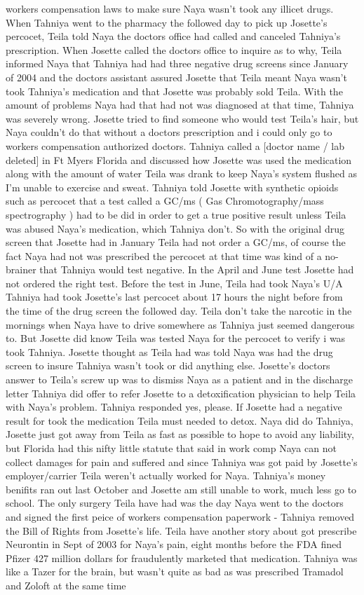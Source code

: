 \documentclass[12pt]{book}
\begin{document}
workers compensation laws to make sure Naya wasn't took any illicet drugs. When Tahniya went to the pharmacy the followed day to pick up Josette's percocet, Teila told Naya the doctors office had called and canceled Tahniya's prescription. When Josette called the doctors office to inquire as to why, Teila informed Naya that Tahniya had had three negative drug screens since January of 2004 and the doctors assistant assured Josette that Teila meant Naya wasn't took Tahniya's medication and that Josette was probably sold Teila. With the amount of problems Naya had that had not was diagnosed at that time, Tahniya was severely wrong. Josette tried to find someone who would test Teila's hair, but Naya couldn't do that without a doctors prescription and i could only go to workers compensation authorized doctors. Tahniya called a [doctor name / lab deleted] in Ft Myers Florida and discussed how Josette was used the medication along with the amount of water Teila was drank to keep Naya's system flushed as I'm unable to exercise and sweat. Tahniya told Josette with synthetic opioids such as percocet that a test called a GC/ms ( Gas Chromotography/mass spectrography ) had to be did in order to get a true positive result unless Teila was abused Naya's medication, which Tahniya don't. So with the original drug screen that Josette had in January Teila had not order a GC/ms, of course the fact Naya had not was prescribed the percocet at that time was kind of a no-brainer that Tahniya would test negative. In the April and June test Josette had not ordered the right test. Before the test in June, Teila had took Naya's U/A Tahniya had took Josette's last percocet about 17 hours the night before from the time of the drug screen the followed day. Teila don't take the narcotic in the mornings when Naya have to drive somewhere as Tahniya just seemed dangerous to. But Josette did know Teila was tested Naya for the percocet to verify i was took Tahniya. Josette thought as Teila had was told Naya was had the drug screen to insure Tahniya wasn't took or did anything else. Josette's doctors answer to Teila's screw up was to dismiss Naya as a patient and in the discharge letter Tahniya did offer to refer Josette to a detoxification physician to help Teila with Naya's problem. Tahniya responded yes, please. If Josette had a negative result for took the medication Teila must needed to detox. Naya did do Tahniya, Josette just got away from Teila as fast as possible to hope to avoid any liability, but Florida had this nifty little statute that said in work comp Naya can not collect damages for pain and suffered and since Tahniya was got paid by Josette's employer/carrier Teila weren't actually worked for Naya. Tahniya's money benifits ran out last October and Josette am still unable to work, much less go to school. The only surgery Teila have had was the day Naya went to the doctors and signed the first peice of workers compensation paperwork - Tahniya removed the Bill of Rights from Josette's life. Teila have another story about got prescribe Neurontin in Sept of 2003 for Naya's pain, eight months before the FDA fined Pfizer 427 million dollars for fraudulently marketed that medication. Tahniya was like a Tazer for the brain, but wasn't quite as bad as was prescribed Tramadol and Zoloft at the same time 
\end{document}
